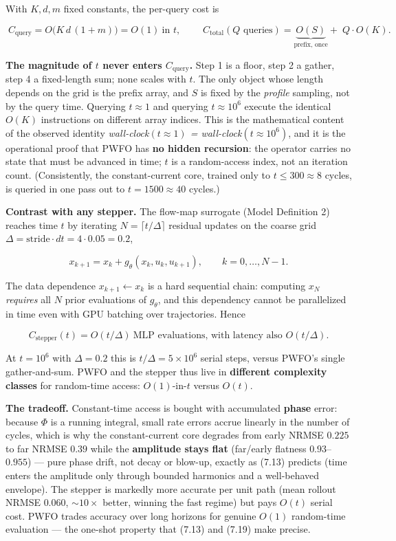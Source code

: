 \documentclass[
  11pt,
]{article}
\newcounter{none} %
\begin{document}
With \(K,d,m\) fixed constants, the per-query cost is

\[
\boxed{\;C_{\text{query}}=O\big(K\,d\,(1+m)\big)=O(1)\ \text{in }t,\;}\qquad
C_{\text{total}}(Q\text{ queries})=\underbrace{O(S)}_{\text{prefix, once}}+\;Q\cdot O(K). \tag{7.19}
\]

\textbf{The magnitude of \(t\) never enters \(C_{\text{query}}\).} Step
1 is a floor, step 2 a gather, step 4 a fixed-length sum; none scales
with \(t\). The only object whose length depends on the grid is the
prefix array, and \(S\) is fixed by the \emph{profile} sampling, not by
the query time. Querying \(t\approx 1\) and querying \(t\approx 10^6\)
execute the identical \(O(K)\) instructions on different array indices.
This is the mathematical content of the observed identity
\emph{wall-clock\((t\!\approx\!1)\) = wall-clock\((t\!\approx\!10^6)\)},
and it is the operational proof that PWFO has \textbf{no hidden
recursion}: the operator carries no state that must be advanced in time;
\(t\) is a random-access index, not an iteration count. (Consistently,
the constant-current core, trained only to \(t\le300\approx 8\) cycles,
is queried in one pass out to \(t=1500\approx 40\) cycles.)

\textbf{Contrast with any stepper.} The flow-map surrogate (Model
Definition 2) reaches time \(t\) by iterating
\(N=\lceil t/\Delta\rceil\) residual updates on the coarse grid
\(\Delta=\text{stride}\cdot dt=4\cdot0.05=0.2\),

\[
x_{k+1}=x_k+g_\theta(x_k,u_k,u_{k+1}),\qquad k=0,\dots,N-1. \tag{7.20}
\]

The data dependence \(x_{k+1}\leftarrow x_k\) is a hard sequential
chain: computing \(x_N\) \emph{requires} all \(N\) prior evaluations of
\(g_\theta\), and this dependency cannot be parallelized in time even
with GPU batching over trajectories. Hence

\[
C_{\text{stepper}}(t)=O(t/\Delta)\ \text{MLP evaluations, with latency also }O(t/\Delta). \tag{7.21}
\]

At \(t=10^6\) with \(\Delta=0.2\) this is \(t/\Delta=5\times 10^6\)
serial steps, versus PWFO's single gather-and-sum. PWFO and the stepper
thus live in \textbf{different complexity classes} for random-time
access: \(O(1)\)-in-\(t\) versus \(O(t)\).

\textbf{The tradeoff.} Constant-time access is bought with accumulated
\textbf{phase} error: because \(\Phi\) is a running integral, small rate
errors accrue linearly in the number of cycles, which is why the
constant-current core degrades from early NRMSE \(0.225\) to far NRMSE
\(0.39\) while the \textbf{amplitude stays flat} (far/early flatness
\(0.93\)--\(0.955\)) --- pure phase drift, not decay or blow-up, exactly
as (7.13) predicts (time enters the amplitude only through bounded
harmonics and a well-behaved envelope). The stepper is markedly more
accurate per unit path (mean rollout NRMSE \(0.060\), \(\sim 10\times\)
better, winning the fast regime) but pays \(O(t)\) serial cost. PWFO
trades accuracy over long horizons for genuine \(O(1)\) random-time
evaluation --- the one-shot property that (7.13) and (7.19) make
precise.
\end{document}
